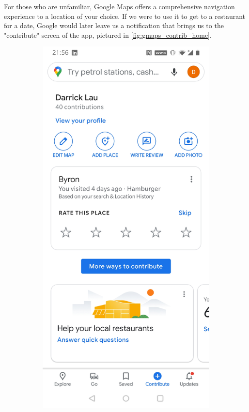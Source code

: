 For those who are unfamiliar, Google Maps offers a comprehensive navigation experience to a location of your choice. If we were to use it to get to a restaurant for a date, Google would later leave us a notification that brings us to the "contribute" screen of the app, pictured in \ref{fig:gmaps_contrib_home}.

\begin{figure}[htb!]
    \begin{center}
        \begin{subfigure}{.3\textwidth}
            \centering
            \includegraphics[width=0.8\linewidth]{images/gmaps_contribute.jpg}

\end{subfigure}
\end{center}
\end{figure}
